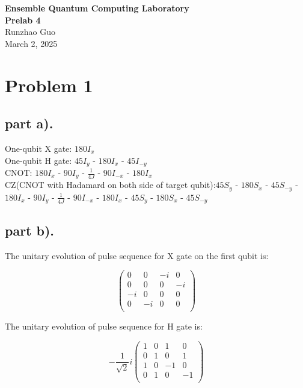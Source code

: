 \documentclass[11pt]{article}
\newcommand{\courseName}{Ensemble Quantum Computing Laboratory}     %
\newcommand{\assignmentTitle}{Prelab 4} %
\newcommand{\studentName}{Runzhao Guo}       %
\newcommand{\Date}{March 2, 2025}   %
\begin{document}
\begin{center}
    {\large \textbf{\courseName}} \\
    \vspace{3pt}
    {\Large \textbf{\assignmentTitle}} \\
    \vspace{3pt}
    \studentName \\
    \vspace{3pt}
    \Date
\end{center}

\vspace{0.5in} %

\section*{Problem 1}

\subsection*{part a).}
One-qubit X gate: $180I_{x}$\\
One-qubit H gate: $45I_{y}$ - $180I_{x}$ - $45I_{-y}$\\
CNOT: $180I_{x}$ - $90I_y$ - $\frac{1}{4J}$ - $90I_{-x}$ - $180I_{x}$\\
CZ(CNOT with Hadamard on both side of target qubit):$45S_{y}$ - $180S_{x}$ - $45S_{-y}$ - $180I_{x}$ - $90I_y$ - $\frac{1}{4J}$ - $90I_{-x}$ - $180I_{x}$ - $45S_{y}$ - $180S_{x}$ - $45S_{-y}$

\subsection*{part b).}
The unitary evolution of pulse sequence for X gate on the first qubit is:

\[
\begin{pmatrix}
0 & 0 & -i & 0 \\
0 & 0 & 0 & -i \\
-i & 0 & 0 & 0 \\
0 & -i & 0 & 0 \\
\end{pmatrix}
\]

The unitary evolution of pulse sequence for H gate is:

\[
-\frac{1}{\sqrt{2}}i
\begin{pmatrix}
1 & 0 & 1 & 0 \\
0 & 1 & 0 & 1 \\
1 & 0 & -1 & 0 \\
0 & 1 & 0 & -1 \\
\end{pmatrix}
\]
\end{document}
